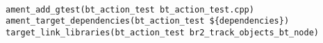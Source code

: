  \footnotesize
\begin{tcolorbox}[sharp corners, colframe=gray!80, colback=LightGray, left=0pt, top=0pt, bottom=0pt, title=\texttt{br2\_bt\_patrolling/tests/CMakeLists.txt}]
  \begin{verbatim}

ament_add_gtest(bt_action_test bt_action_test.cpp)
ament_target_dependencies(bt_action_test ${dependencies})
target_link_libraries(bt_action_test br2_track_objects_bt_node)
    \end{verbatim}
    \end{tcolorbox}
  \normalsize


